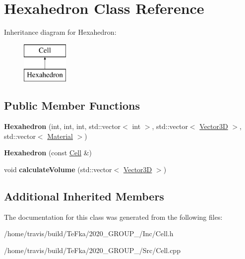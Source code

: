 \hypertarget{class_hexahedron}{}\section{Hexahedron Class Reference}
\label{class_hexahedron}
Inheritance diagram for Hexahedron\+:\begin{figure}[H]
\begin{center}
\leavevmode
\includegraphics[height=2.000000cm]{class_hexahedron}
\end{center}
\end{figure}
\subsection*{Public Member Functions}
\begin{DoxyCompactItemize}
\item 
{\bfseries Hexahedron} (int, int, int, std\+::vector$<$ int $>$, std\+::vector$<$ \hyperlink{class_vector3_d}{Vector3D} $>$, std\+::vector$<$ \hyperlink{class_material}{Material} $>$)\hypertarget{class_hexahedron_a6144c98029c2bb69ba56b68482a1704a}{}\label{class_hexahedron_a6144c98029c2bb69ba56b68482a1704a}

\item 
{\bfseries Hexahedron} (const \hyperlink{class_cell}{Cell} \&)\hypertarget{class_hexahedron_a4f076e319bb170539c46610be559823d}{}\label{class_hexahedron_a4f076e319bb170539c46610be559823d}

\item 
void {\bfseries calculate\+Volume} (std\+::vector$<$ \hyperlink{class_vector3_d}{Vector3D} $>$)\hypertarget{class_hexahedron_a7258ffb005cdc253db5de33fd2b581ce}{}\label{class_hexahedron_a7258ffb005cdc253db5de33fd2b581ce}

\end{DoxyCompactItemize}
\subsection*{Additional Inherited Members}


The documentation for this class was generated from the following files\+:\begin{DoxyCompactItemize}
\item 
/home/travis/build/\+Te\+Fka/2020\+\_\+\+G\+R\+O\+U\+P\+\_/\+Inc/Cell.\+h\item 
/home/travis/build/\+Te\+Fka/2020\+\_\+\+G\+R\+O\+U\+P\+\_/\+Src/Cell.\+cpp\end{DoxyCompactItemize}
